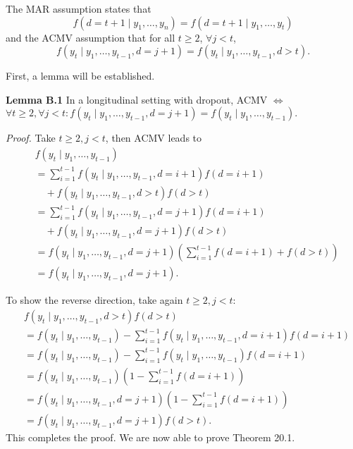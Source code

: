 \documentclass[UTF8,a4paper,10pt]{article}
\begin{document}
The MAR assumption states that
\begin{equation*}
    f(d = t + 1\mid y_1,\ldots,y_n) = f(d = t + 1\mid y_1,\ldots,y_t) \tag*{(B.9)}
\end{equation*}
and the ACMV assumption that for all \(t \geq 2\), \(\forall j < t\),
\begin{equation*}
    f(y_t\mid y_1,\ldots,y_{t-1}, d = j + 1) = f(y_t\mid y_1,\ldots,y_{t-1},d > t). \tag*{(B.10)}
\end{equation*}

First, a lemma will be established.

\textbf{Lemma B.1} In a longitudinal setting with dropout, ACMV \(\Leftrightarrow\) \(\forall t \geq 2, \forall j < t : f(y_t\mid y_1,\ldots,y_{t-1}, d = j + 1) = f(y_t\mid y_1,\ldots,y_{t-1}).\)

\textit{Proof.} Take \(t \geq 2, j < t\), then ACMV leads to
\begin{align*}
    &f(y_t\mid y_1,\ldots,y_{t-1}) \\
    &= \sum_{i=1}^{t-1} f(y_t\mid y_1,\ldots,y_{t-1}, d = i + 1)f(d = i + 1) \\
    &\quad + f(y_t\mid y_1,\ldots,y_{t-1},d > t)f(d>t) \\
    &= \sum_{i=1}^{t-1} f(y_t\mid y_1,\ldots,y_{t-1}, d = j + 1)f(d = i + 1) \\
    &\quad + f(y_t\mid y_1,\ldots,y_{t-1}, d = j + 1)f(d>t) \\
    &= f(y_t\mid y_1,\ldots,y_{t-1}, d = j + 1) \left( \sum_{i=1}^{t-1} f(d = i + 1) + f(d>t) \right) \\
    &= f(y_t\mid y_1,\ldots,y_{t-1}, d = j + 1).
\end{align*}

To show the reverse direction, take again \(t \geq 2, j < t\):
\begin{align*}
    &f(y_t\mid y_1,\ldots,y_{t-1},d > t)f(d>t) \\
    &= f(y_t\mid y_1,\ldots,y_{t-1}) - \sum_{i=1}^{t-1} f(y_t\mid y_1,\ldots,y_{t-1}, d = i + 1)f(d = i + 1) \\
    &= f(y_t\mid y_1,\ldots,y_{t-1}) - \sum_{i=1}^{t-1} f(y_t\mid y_1,\ldots,y_{t-1})f(d = i + 1) \\
    &= f(y_t\mid y_1,\ldots,y_{t-1}) \left( 1 - \sum_{i=1}^{t-1} f(d = i + 1) \right)\\
    &= f(y_t\mid y_1,\ldots,y_{t-1}, d = j + 1) \left(1 - \sum_{i=1}^{t-1} f(d = i + 1)\right) \\
    &= f(y_t\mid y_1,\ldots,y_{t-1}, d = j + 1)f(d>t).
\end{align*}
This completes the proof. We are now able to prove Theorem 20.1.
\end{document}
